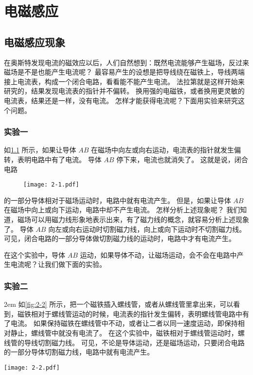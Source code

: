 \chapter{电磁感应}\label{chp:electromagnetic_induction}
\section{电磁感应现象}
在奥斯特发现电流的磁效应以后，人们自然想到：既然电流能够产生磁场，反过来磁场是不是也能产生电流呢？
最容易产生的设想是把导线绕在磁铁上，导线两端接上电流表，构成一个闭合电路，看看能不能产生电流。
法拉第就是这样开始来研究的，结果发现电流表的指针并不偏转。
换用强的电磁铁，或者换用更灵敏的电流表，结果还是一样，没有电流。
怎样才能获得电流呢？下面用实验来研究这个问题。

\subsection*{实验一}
如\cref{fig:2-1} 所示，如果让导体 $AB$ 在磁场中向左或向右运动，电流表的指针就发生偏转，表明电路中有了电流。
导体 $AB$ 停下来，电流也就消失了。
这就是说，闭合电路
\begin{figure}
  \texttt{[image: 2-1.pdf]}
  \caption{}\label{fig:2-1}
\end{figure}
的一部分导体相对于磁场运动时，电路中就有电流产生。
但是，如果让导体 $AB$ 在磁场中向上或向下运动，电路中却不产生电流。
怎样分析上述现象呢？
我们知道，磁场可以用磁力线形象地表示出来，有了磁力线的概念，就容易分析上述现象了。
导体 $AB$ 向左或向右运动时切割磁力线，向上或向下运动时不切割磁力线。可见，闭合电路的一部分导体做切割磁力线的运动时，电路中才有电流产生。

在这个实验中，导体 $AB$ 运动，如果导体不动，让磁场运动，会不会在电路中产生电流呢？让我们做下面的实验。

\subsection*{实验二}
\medskip\noindent
\begin{minipage}{0.62\linewidth}\parindent2em
如\cref{fig:2-2} 所示，把一个磁铁插入螺线管，或者从螺线管里拿出来，可以看到，磁铁相对于螺线管运动的时候，电流表的指针发生偏转，表明螺线管电路中有了电流。
如果保持磁铁在螺线管中不动，或者让二者以同一速度运动，即保持相对静止，螺线管中就没有电流了。
在这个实验中，磁铁相对于螺线管运动时，螺线管的导线切割磁力线。
可见，不论是导体运动，还是磁场运动，只要闭合电路的一部分导体切割磁力线，电路中就有电流产生。
\end{minipage}\hfill
\begin{minipage}{0.33\linewidth}\centering
\begin{figurehere}
\texttt{[image: 2-2.pdf]}
\caption{}\label{fig:2-2}
\end{figurehere}
\end{minipage}

